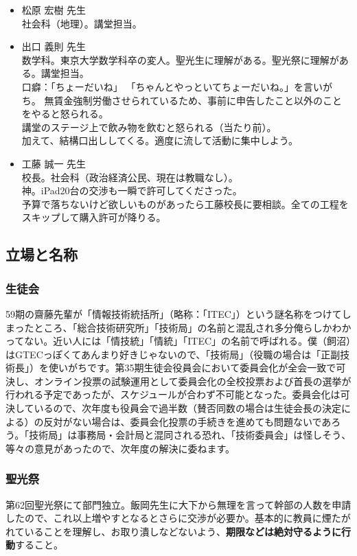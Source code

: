 \documentclass[dvipdfmx,jb5]{jarticle}
\begin{document}
\begin{itemize}
  \item 松原 宏樹 先生\\
  社会科（地理）。講堂担当。

  \item 出口 義則 先生\\
  数学科。東京大学数学科卒の変人。聖光生に理解がある。聖光祭に理解がある。講堂担当。
  \\口癖：「ちょーだいね」
  「ちゃんとやっといてちょーだいね。」を言いがち。
  無賃金強制労働させられているため、事前に申告したこと以外のことをやると怒られる。\\
  講堂のステージ上で飲み物を飲むと怒られる（当たり前）。\\
  加えて、結構口出ししてくる。適度に流して活動に集中しよう。

  \item 工藤 誠一 先生\\
  校長。社会科（政治経済公民、現在は教職なし）。\\
  神。iPad20台の交渉も一瞬で許可してくださった。\\
  予算で落ちないけど欲しいものがあったら工藤校長に要相談。全ての工程をスキップして購入許可が降りる。
\end{itemize}

\subsection{立場と名称}
\subsubsection{生徒会}
59期の齋藤先輩が「情報技術統括所」（略称：「ITEC」）という謎名称をつけてしまったところ、「総合技術研究所」「技術局」の名前と混乱され多分俺らしかわかってない。近い人には「情技統」「情統」「ITEC」の名前で呼ばれる。僕（飼沼）はGTECっぽくてあんまり好きじゃないので、「技術局」（役職の場合は「正副技術長」）を使いがちです。第35期生徒会役員会において委員会化が全会一致で可決し、オンライン投票の試験運用として委員会化の全校投票および首長の選挙が行われる予定であったが、スケジュールが合わず不可能となった。委員会化は可決しているので、次年度も役員会で過半数（賛否同数の場合は生徒会長の決定による）の反対がない場合は、委員会化投票の手続きを進めても問題ないであろう。「技術局」は事務局・会計局と混同される恐れ、「技術委員会」は怪しそう、等々の意見があったので、次年度の解決に委ねます。
\subsubsection{聖光祭}
第62回聖光祭にて部門独立。飯岡先生に大下から無理を言って幹部の人数を申請したので、これ以上増やすとなるとさらに交渉が必要か。基本的に教員に煙たがれていることを理解し、お取り潰しなどないよう、{\bf 期限などは絶対守るように行動}すること。
\end{document}

